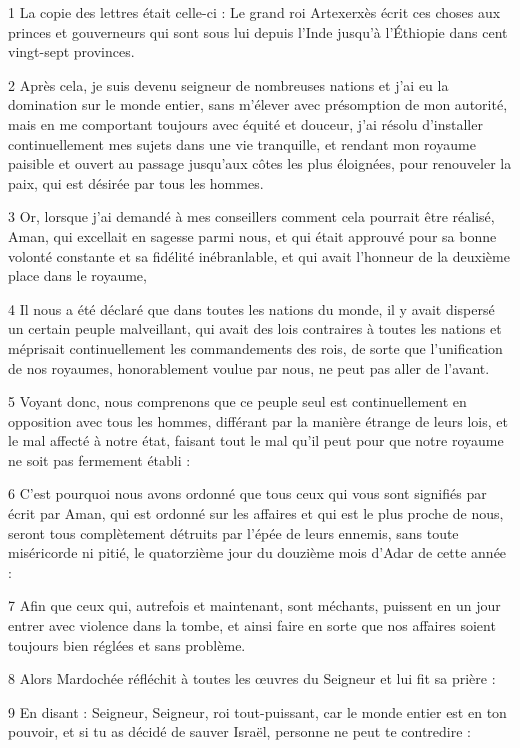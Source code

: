 \par 1 La copie des lettres était celle-ci : Le grand roi Artexerxès écrit ces choses aux princes et gouverneurs qui sont sous lui depuis l'Inde jusqu'à l'Éthiopie dans cent vingt-sept provinces.
\par 2 Après cela, je suis devenu seigneur de nombreuses nations et j'ai eu la domination sur le monde entier, sans m'élever avec présomption de mon autorité, mais en me comportant toujours avec équité et douceur, j'ai résolu d'installer continuellement mes sujets dans une vie tranquille, et rendant mon royaume paisible et ouvert au passage jusqu'aux côtes les plus éloignées, pour renouveler la paix, qui est désirée par tous les hommes.
\par 3 Or, lorsque j'ai demandé à mes conseillers comment cela pourrait être réalisé, Aman, qui excellait en sagesse parmi nous, et qui était approuvé pour sa bonne volonté constante et sa fidélité inébranlable, et qui avait l'honneur de la deuxième place dans le royaume,
\par 4 Il nous a été déclaré que dans toutes les nations du monde, il y avait dispersé un certain peuple malveillant, qui avait des lois contraires à toutes les nations et méprisait continuellement les commandements des rois, de sorte que l'unification de nos royaumes, honorablement voulue par nous, ne peut pas aller de l'avant.
\par 5 Voyant donc, nous comprenons que ce peuple seul est continuellement en opposition avec tous les hommes, différant par la manière étrange de leurs lois, et le mal affecté à notre état, faisant tout le mal qu'il peut pour que notre royaume ne soit pas fermement établi :
\par 6 C'est pourquoi nous avons ordonné que tous ceux qui vous sont signifiés par écrit par Aman, qui est ordonné sur les affaires et qui est le plus proche de nous, seront tous complètement détruits par l'épée de leurs ennemis, sans toute miséricorde ni pitié, le quatorzième jour du douzième mois d'Adar de cette année :
\par 7 Afin que ceux qui, autrefois et maintenant, sont méchants, puissent en un jour entrer avec violence dans la tombe, et ainsi faire en sorte que nos affaires soient toujours bien réglées et sans problème.
\par 8 Alors Mardochée réfléchit à toutes les œuvres du Seigneur et lui fit sa prière :
\par 9 En disant : Seigneur, Seigneur, roi tout-puissant, car le monde entier est en ton pouvoir, et si tu as décidé de sauver Israël, personne ne peut te contredire :
